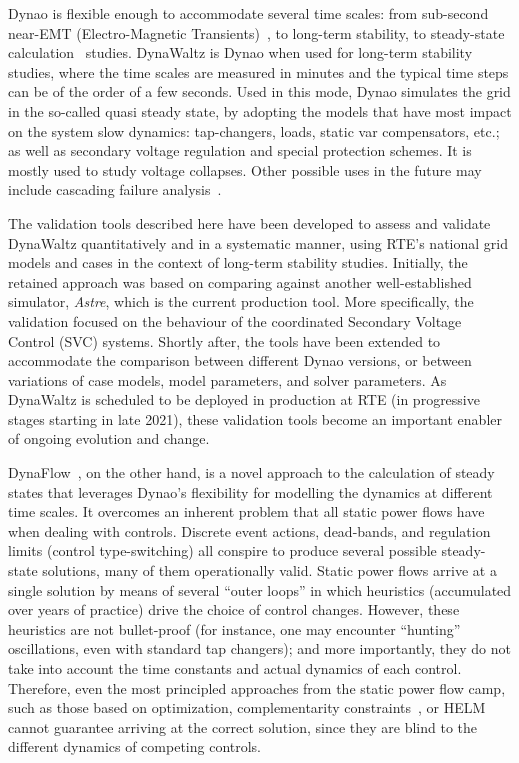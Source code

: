\documentclass[conference]{IEEEtran}
\newcommand{\Dynawo}{Dyna\textomega o} %
\begin{document}
\Dynawo{} is flexible enough to accommodate several time scales: from sub-second
near-EMT (Electro-Magnetic Transients)~\cite{Masoon21}, to long-term stability,
to steady-state calculation~\cite{Cossart21} studies. DynaWaltz is \Dynawo{} when
used for long-term stability studies, where the time scales are measured in
minutes and the typical time steps can be of the order of a few seconds. Used in
this mode, \Dynawo{} simulates the grid in the so-called quasi steady state, by
adopting the models that have most impact on the system slow dynamics:
tap-changers, loads, static var compensators, etc.; as well as secondary voltage
regulation and special protection schemes. It is mostly used to study voltage
collapses. Other possible uses in the future may include cascading failure
analysis~\cite{Bialek16}.

The validation tools described here have been developed to assess and validate
DynaWaltz quantitatively and in a systematic manner, using RTE's national grid
models and cases in the context of long-term stability studies. Initially, the retained
approach was based on comparing against another well-established simulator,
\emph{Astre}, which is the current production tool. More specifically, the
validation focused on the behaviour of the coordinated Secondary Voltage
Control (SVC) systems. Shortly after, the tools have been extended to accommodate the
comparison between different \Dynawo{} versions, or between variations of case
models, model parameters, and solver parameters. As DynaWaltz is scheduled to be
deployed in production at RTE (in progressive stages starting in late 2021),
these validation tools become an important enabler of ongoing evolution and
change.

DynaFlow~\cite{Cossart21}, on the other hand, is a novel approach to the
calculation of steady states that leverages \Dynawo's flexibility for modelling
the dynamics at different time scales. It overcomes an inherent problem that all
static power flows have when dealing with controls.  Discrete event actions,
dead-bands, and regulation limits (control type-switching) all conspire to
produce several possible steady-state solutions, many of them operationally
valid.  Static power flows arrive at a single solution by means of several
``outer loops'' in which heuristics (accumulated over years of practice) drive
the choice of control changes. However, these heuristics are not bullet-proof
(for instance, one may encounter ``hunting'' oscillations, even with standard
tap changers); and more importantly, they do not take into account the time
constants and actual dynamics of each control. Therefore, even the most
principled approaches from the static power flow camp, such as those based on
optimization\cite{Ju20}, complementarity constraints~\cite{Murray15}, or
HELM~\cite{Trias18} cannot guarantee arriving at the correct solution, since
they are blind to the different dynamics of competing controls.
\end{document}

